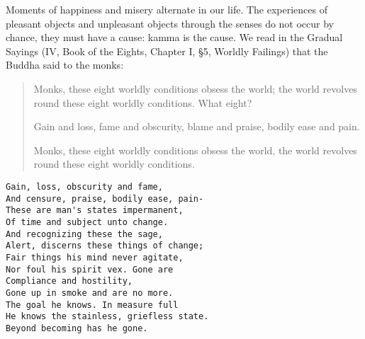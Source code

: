 \documentclass{book}
\begin{document}
Moments of happiness and misery alternate in our life. The experiences
of pleasant objects and unpleasant objects through the senses do not
occur by chance, they must have a cause: kamma is the cause. We read in
the Gradual Sayings (IV, Book of the Eights, Chapter I, §5, Worldly
Failings) that the Buddha said to the monks:

\begin{quote}
Monks, these eight worldly conditions obsess the world; the world
revolves round these eight worldly conditions. What eight?

Gain and loss, fame and obscurity, blame and praise, bodily ease and
pain.

Monks, these eight worldly conditions obsess the world, the world
revolves round these eight worldly conditions.
\end{quote}

\begin{verbatim}
Gain, loss, obscurity and fame,
And censure, praise, bodily ease, pain-
These are man's states impermanent,
Of time and subject unto change.
And recognizing these the sage,
Alert, discerns these things of change;
Fair things his mind never agitate,
Nor foul his spirit vex. Gone are
Compliance and hostility,
Gone up in smoke and are no more.
The goal he knows. In measure full
He knows the stainless, griefless state.
Beyond becoming has he gone.
\end{verbatim}
\end{document}
